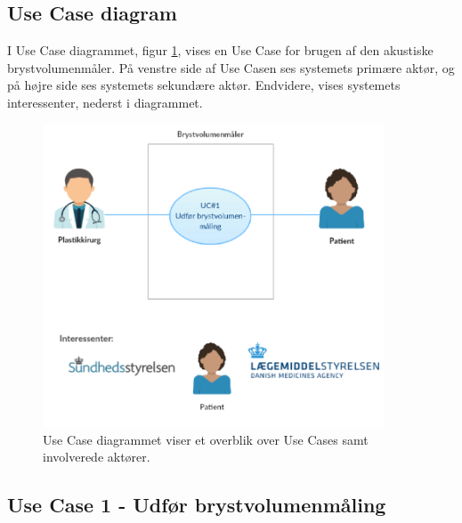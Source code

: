 	\pagebreak
	
		\subsection{Use Case diagram}
		I Use Case diagrammet, figur \ref{fig:UC1}, vises en Use Case for brugen af den akustiske brystvolumenmåler. På venstre side af Use Casen ses systemets primære aktør, og på højre side ses systemets sekundære aktør. Endvidere, vises systemets interessenter, nederst i diagrammet.  
	
			\begin{figure}[htb]
				\centering
					\includegraphics[width=4in]{UC1.png}
					\caption{Use Case diagrammet viser et overblik over Use Cases samt involverede aktører.}
					\label{fig:UC1}
			\end{figure}	 
	\pagebreak	
	\newpage	
  
  		\subsection{Use Case 1 - Udfør brystvolumenmåling}
  			
